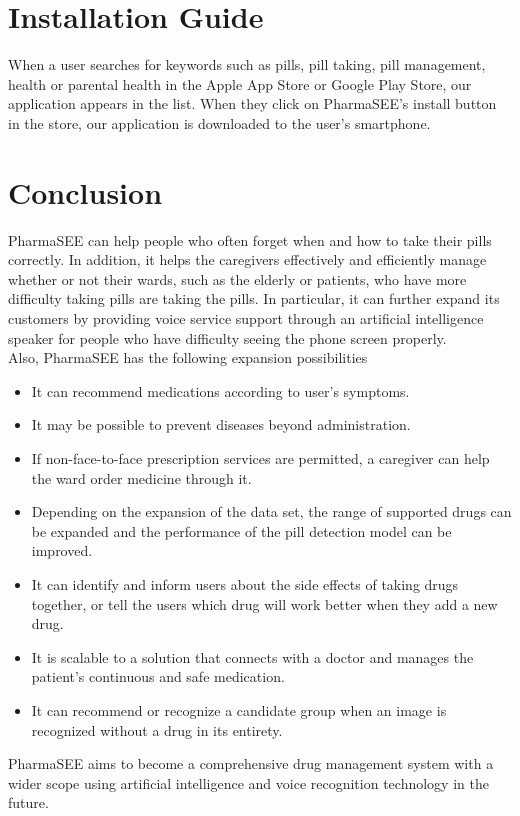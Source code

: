 \documentclass[conference]{IEEEtran}
\begin{document}
\section{Installation Guide}
When a user searches for keywords such as pills, pill taking, pill management, health or parental health in the Apple App Store or Google Play Store, our application appears in the list. When they click on PharmaSEE's install button in the store, our application is downloaded to the user's smartphone. \\

\section{Conclusion}
PharmaSEE can help people who often forget when and how to take their pills correctly. In addition, it helps the caregivers effectively and efficiently manage whether or not their wards, such as the elderly or patients, who have more difficulty taking pills are taking the pills. In particular, it can further expand its customers by providing voice service support through an artificial intelligence speaker for people who have difficulty seeing the phone screen properly.\\ 

Also, PharmaSEE has the following expansion possibilities \\

\begin{itemize}
  \item It can recommend medications according to user's symptoms.\\
  \item It may be possible to prevent diseases beyond administration.\\
  \item If non-face-to-face prescription services are permitted, a caregiver can help the ward order medicine through it.\\
  \item Depending on the expansion of the data set, the range of supported drugs can be expanded and the performance of the pill detection model can be improved.\\
  \item It can identify and inform users about the side effects of taking drugs together, or tell the users which drug will work better when they add a new drug.\\
  \item It is scalable to a solution that connects with a doctor and manages the patient's continuous and safe medication.\\
  \item It can recommend or recognize a candidate group when an image is recognized without a drug in its entirety.\\
\end{itemize}

PharmaSEE aims to become a comprehensive drug management system with a wider scope using artificial intelligence and voice recognition technology in the future. \\
\end{document}
